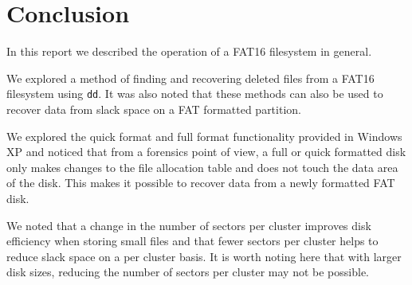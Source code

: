 \documentclass[a4paper,
    11pt,
    normalheadings,
    parindent,
    UKenglish,
    abstracton,
    ]{scrartcl}
\begin{document}
\section{Conclusion}
In this report we described the operation of a FAT16 filesystem in general.

We explored a method of finding and recovering deleted files from a FAT16 filesystem using \texttt{dd}. It was also noted that these methods can also be used to recover data from slack space on a FAT formatted partition.

We explored the quick format and full format functionality provided in Windows XP and noticed that from a forensics point of view, a full or quick formatted disk only makes changes to the file allocation table  and does not touch the data area of the disk. This makes it possible to recover data from a newly formatted FAT disk.

We noted that a change in the number of sectors per cluster improves disk efficiency when storing small files and that fewer sectors per cluster helps to reduce slack space on a per cluster basis. It is worth noting here that with larger disk sizes, reducing the number of sectors per cluster may not be possible.
\end{document}
